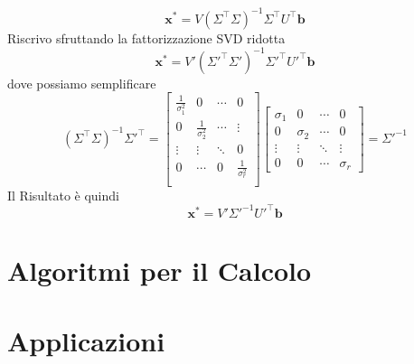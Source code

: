 \documentclass[11pt]{article}
\begin{document}
\[
\mathbf{x}^* = V (\Sigma^\top \Sigma)^{-1} \Sigma^\top U^\top \mathbf{b}
\]
Riscrivo sfruttando la fattorizzazione SVD ridotta
\[
\mathbf{x}^* = V' (\Sigma'^\top \Sigma')^{-1} \Sigma'^\top U'^\top \mathbf{b}
\]
dove possiamo semplificare
\[
(\Sigma^\top \Sigma)^{-1} \Sigma'^\top=
\begin{bmatrix}
\frac{1}{\sigma_1^2} & 0 & \cdots & 0 \\
0 & \frac{1}{\sigma_2^2} & \cdots & \vdots \\
\vdots & \vdots & \ddots & 0  \\
0 & \cdots & 0 & \frac{1}{\sigma_r^2}  \\
\end{bmatrix}\begin{bmatrix}
    \sigma_1 & 0 & \cdots & 0 \\
    0 & \sigma_2 & \cdots & 0 \\
    \vdots & \vdots & \ddots & \vdots \\
    0 & 0 & \cdots & \sigma_r
\end{bmatrix}=\Sigma'^{-1}
\]
Il Risultato è quindi
\[
\mathbf{x}^* = V' \Sigma'^{-1} U'^\top \mathbf{b}
\]

\section{Algoritmi per il Calcolo}
\newpage
\section{Applicazioni}
\end{document}
